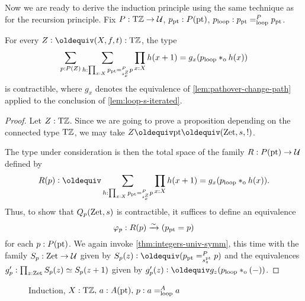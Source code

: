 \documentclass[a4,12pt]{amsart}
\begin{document}
Now we are ready to derive the induction principle using the same technique as for the recursion principle.
Fix $P : {\mathrm{T}\mathbb{Z}} \to \mathcal{U}$, $p_{\mathord{\mathrm{pt}}} : P({\mathord{\mathrm{pt}}})$, $p_{\mathrm{loop}} : p_{\mathord{\mathrm{pt}}} =^P_{\mathrm{loop}} p_{\mathord{\mathrm{pt}}}$.
\begin{lemma}\label{lem:guided-null-hmtps-dep}
  For every $Z\defeq(X,f,t):\TorZ$, the type
  \[
    \sum_{p : P(Z)} \sum_{h : \prod_{x:X} p_{\mathord{\mathrm{pt}}} =^P_{s^Z_x} p} \prod_{x:X} h(x+1) = g_x(p_{\mathrm{loop}} *_{\mathrm{o}} h(x))
  \]
  is contractible, where $g_x$ denotes the equivalence of \cref{lem:pathover-change-path} applied to the conclusion of \cref{lem:loop-s-iterated}.
\end{lemma}
\begin{proof}
  Let $Z:{\mathrm{T}\mathbb{Z}}$. Since we are going to prove a proposition
  depending on the connected type ${\mathrm{T}\mathbb{Z}}$,
  we may take $Z\jdeq\pt\jdeq(\zet,s,!)$.

  The type under consideration is then the total space of the family $R : P({\mathord{\mathrm{pt}}}) \to \mathcal{U}$ defined by
  \[
    R(p) \defeq \sum_{h : \prod_{x:X} p_\pt =^P_{s^Z_x} p} \prod_{x:X} h(x+1) =  g_x(p_\Zloop \cto h(x)).
  \]
  Thus, to show that $Q_p(\mathrm{Zet},s)$ is contractible,
  it suffices to define an equivalence
  \[
    \varphi_p : R(p) \xrightarrow{\sim}{} (p_{\mathord{\mathrm{pt}}} = p)
  \]
  for each $p : P({\mathord{\mathrm{pt}}})$.
  We again invoke \cref{thm:integers-univ-symm},
  this time with the family $S_p : \mathrm{Zet} \to \mathcal{U}$ given by $S_p(z) \defeq (p_\pt =^P_{s^\pt_z} p)$
  and the equivalences $g'_p : \prod_{z:\mathrm{Zet}} S_p(z)\simeq S_p(z+1)$ given by
  $g'_p(z) \defeq g_z(p_\Zloop \cto ({-}))$.
\end{proof}

\begin{figure}
\caption{\label{fig:TorZ-induction}Induction, $X:{\mathrm{T}\mathbb{Z}},\, a:A({\mathord{\mathrm{pt}}}),\, p:a=^A_{\mathrm{loop}} a$}
\end{figure}




\end{document}
